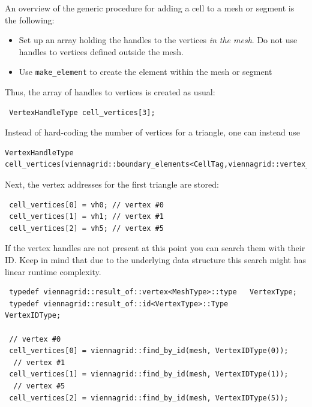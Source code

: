 

An overview of the generic procedure for adding a cell to a mesh or segment is the following:
  \begin{itemize}
   \item Set up an array holding the handles to the vertices \emph{in the mesh}. Do not use handles to vertices defined outside the mesh.
   \item Use \lstinline|make_element| to create the element within the mesh or segment
  \end{itemize}
Thus, the array of handles to vertices is created as usual:
\begin{lstlisting}
 VertexHandleType cell_vertices[3];
\end{lstlisting}
Instead of hard-coding the number of vertices for a triangle, one can instead use
\begin{lstlisting}
VertexHandleType cell_vertices[viennagrid::boundary_elements<CellTag,viennagrid::vertex_tag>::num];
\end{lstlisting}


Next, the vertex addresses for the first triangle are stored:
\begin{lstlisting}
 cell_vertices[0] = vh0; // vertex #0
 cell_vertices[1] = vh1; // vertex #1
 cell_vertices[2] = vh5; // vertex #5
\end{lstlisting}


If the vertex handles are not present at this point you can search them with their ID. Keep in mind that due to the underlying data structure this search might has linear runtime complexity.
\begin{lstlisting}
 typedef viennagrid::result_of::vertex<MeshType>::type   VertexType;
 typedef viennagrid::result_of::id<VertexType>::Type       VertexIDType;

 // vertex #0
 cell_vertices[0] = viennagrid::find_by_id(mesh, VertexIDType(0));
  // vertex #1
 cell_vertices[1] = viennagrid::find_by_id(mesh, VertexIDType(1));
  // vertex #5
 cell_vertices[2] = viennagrid::find_by_id(mesh, VertexIDType(5));
\end{lstlisting}

